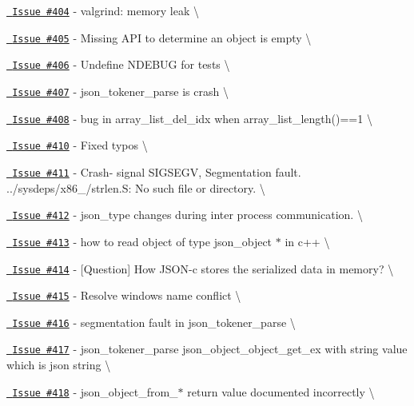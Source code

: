 \begin{DoxyItemize}
\item \href{https://github.com/json-c/json-c/issues/404}{\texttt{ Issue \#404}} -\/ valgrind\+: memory leak \textbackslash{}
\item \href{https://github.com/json-c/json-c/issues/405}{\texttt{ Issue \#405}} -\/ Missing API to determine an object is empty \textbackslash{}
\item \href{https://github.com/json-c/json-c/issues/406}{\texttt{ Issue \#406}} -\/ Undefine NDEBUG for tests \textbackslash{}
\item \href{https://github.com/json-c/json-c/issues/407}{\texttt{ Issue \#407}} -\/ json\+\_\+tokener\+\_\+parse is crash \textbackslash{}
\item \href{https://github.com/json-c/json-c/issues/408}{\texttt{ Issue \#408}} -\/ bug in array\+\_\+list\+\_\+del\+\_\+idx when array\+\_\+list\+\_\+length()==1 \textbackslash{}
\item \href{https://github.com/json-c/json-c/issues/410}{\texttt{ Issue \#410}} -\/ Fixed typos \textbackslash{}
\item \href{https://github.com/json-c/json-c/issues/411}{\texttt{ Issue \#411}} -\/ Crash-\/ signal SIGSEGV, Segmentation fault. ../sysdeps/x86\+\_/strlen.S\+: No such file or directory. \textbackslash{}
\item \href{https://github.com/json-c/json-c/issues/412}{\texttt{ Issue \#412}} -\/ json\+\_\+type changes during inter process communication. \textbackslash{}
\item \href{https://github.com/json-c/json-c/issues/413}{\texttt{ Issue \#413}} -\/ how to read object of type {\ttfamily json\+\_\+object $\ast$} in c++ \textbackslash{}
\item \href{https://github.com/json-c/json-c/issues/414}{\texttt{ Issue \#414}} -\/ \mbox{[}Question\mbox{]} How JSON-\/c stores the serialized data in memory? \textbackslash{}
\item \href{https://github.com/json-c/json-c/issues/415}{\texttt{ Issue \#415}} -\/ Resolve windows name conflict \textbackslash{}
\item \href{https://github.com/json-c/json-c/issues/416}{\texttt{ Issue \#416}} -\/ segmentation fault in json\+\_\+tokener\+\_\+parse \textbackslash{}
\item \href{https://github.com/json-c/json-c/issues/417}{\texttt{ Issue \#417}} -\/ json\+\_\+tokener\+\_\+parse json\+\_\+object\+\_\+object\+\_\+get\+\_\+ex with string value which is json string \textbackslash{}
\item \href{https://github.com/json-c/json-c/issues/418}{\texttt{ Issue \#418}} -\/ json\+\_\+object\+\_\+from\+\_\+$\ast$ return value documented incorrectly \textbackslash{}

\end{DoxyItemize}
